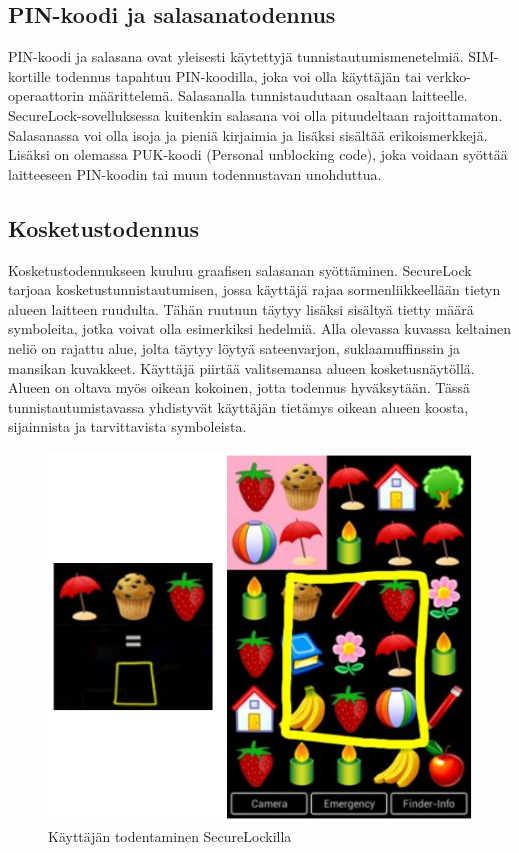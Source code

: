 \documentclass[finnish]{tktltiki2}
\theoremstyle{definition}
\theoremstyle{remark}
\begin{document}
\subsection{PIN-koodi ja salasanatodennus}

PIN-koodi ja salasana ovat yleisesti käytettyjä tunnistautumismenetelmiä. SIM-kortille todennus tapahtuu PIN-koodilla, joka voi olla käyttäjän tai verkko-operaattorin määrittelemä. Salasanalla tunnistaudutaan osaltaan laitteelle. SecureLock-sovelluksessa kuitenkin salasana voi olla pituudeltaan rajoittamaton. Salasanassa voi olla isoja ja pieniä kirjaimia ja lisäksi sisältää erikoismerkkejä.   Lisäksi on olemassa PUK-koodi (Personal unblocking code), joka voidaan syöttää laitteeseen PIN-koodin tai muun todennustavan unohduttua.

\subsection{Kosketustodennus}

Kosketustodennukseen kuuluu graafisen salasanan syöttäminen. SecureLock tarjoaa kosketustunnistautumisen, jossa käyttäjä rajaa sormenliikkeellään tietyn alueen laitteen ruudulta. Tähän ruutuun täytyy lisäksi sisältyä tietty määrä symboleita, jotka voivat olla esimerkiksi hedelmiä. Alla olevassa kuvassa keltainen neliö on rajattu alue, jolta täytyy löytyä sateenvarjon, suklaamuffinssin ja mansikan kuvakkeet. Käyttäjä piirtää valitsemansa alueen kosketusnäytöllä. Alueen on oltava myös oikean kokoinen, jotta todennus hyväksytään. Tässä tunnistautumistavassa yhdistyvät käyttäjän tietämys oikean alueen koosta, sijainnista ja tarvittavista symboleista.


\begin{figure}[h!]
\centering
	\includegraphics[scale=0.5]{gesture}
\caption{Käyttäjän todentaminen SecureLockilla \cite{secure}}
\end{figure}
\end{document}
